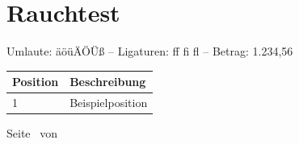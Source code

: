 \documentclass[a4paper,10pt]{article}
\begin{document}
\section{Rauchtest}
Umlaute: äöüÄÖÜß -- Ligaturen: ff fi fl -- Betrag: 1.234,56

\begin{tabularx}{\linewidth}{lX}
\toprule
Position & Beschreibung \\
\midrule
1 & Beispielposition \\
\bottomrule
\end{tabularx}

Seite \thepage\ von \pageref{LastPage}
\end{document}
